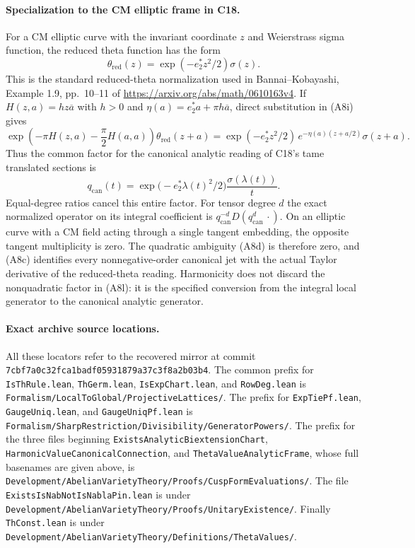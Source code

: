 \paragraph{Specialization to the CM elliptic frame in C18.}
For a CM elliptic curve with the invariant coordinate $z$ and
Weierstrass sigma function, the reduced theta function has the
form
\[
 \theta_{\mathrm{red}}(z)
       =\exp(-e_2^*z^2/2)\sigma(z).
 \tag{A8j}
\]
This is the standard reduced-theta normalization used in
Bannai--Kobayashi, Example 1.9, pp.~10--11 of
\url{https://arxiv.org/abs/math/0610163v4}.
If $H(z,a)=h z\overline a$ with $h>0$ and
$\eta(a)=e_2^*a+\pi h\overline a$, direct substitution in (A8i)
gives
\[
 \exp\left(-\pi H(z,a)-\frac\pi2H(a,a)\right)
          \theta_{\mathrm{red}}(z+a)
       =\exp(-e_2^*z^2/2)\,
             e^{-\eta(a)(z+a/2)}\sigma(z+a).
 \tag{A8k}
\]
Thus the common factor for the canonical analytic reading of
C18's tame translated sections is
\[
      q_{\mathrm{can}}(t)
       =\exp\bigl(-e_2^*\lambda(t)^2/2\bigr)
                         \frac{\sigma(\lambda(t))}{t}.
 \tag{A8l}
\]
Equal-degree ratios cancel this entire factor.  For tensor degree
$d$ the exact normalized operator on its integral coefficient is
$q_{\mathrm{can}}^{-d}D(q_{\mathrm{can}}^d\,\cdot)$.
On an elliptic curve with a CM field acting through a single
tangent embedding, the opposite tangent multiplicity is zero.
The quadratic ambiguity (A8d) is therefore zero, and (A8c)
identifies every nonnegative-order canonical jet with the actual
Taylor derivative of the reduced-theta reading.  Harmonicity
does not discard the nonquadratic factor in (A8l): it is the
specified conversion from the integral local generator to the
canonical analytic generator.

\paragraph{Exact archive source locations.}
All these locators refer to the recovered mirror at commit
\texttt{7cbf7a0c32fca1badf05931879a37c3f8a2b03b4}.
The common prefix for \texttt{IsThRule.lean},
\texttt{ThGerm.lean}, \texttt{IsExpChart.lean}, and
\texttt{RowDeg.lean} is
\texttt{Formalism/LocalToGlobal/ProjectiveLattices/}.
The prefix for \texttt{ExpTiePf.lean},
\texttt{GaugeUniq.lean}, and \texttt{GaugeUniqPf.lean} is
\texttt{Formalism/SharpRestriction/Divisibility/GeneratorPowers/}.
The prefix for the three files beginning
\texttt{ExistsAnalyticBiextensionChart},
\texttt{HarmonicValueCanonicalConnection}, and
\texttt{ThetaValueAnalyticFrame}, whose full basenames are given
above, is
\texttt{Development/AbelianVarietyTheory/Proofs/CuspFormEvaluations/}.
The file \texttt{ExistsIsNabNotIsNablaPin.lean} is under
\texttt{Development/AbelianVarietyTheory/Proofs/UnitaryExistence/}.
Finally \texttt{ThConst.lean} is under
\texttt{Development/AbelianVarietyTheory/Definitions/ThetaValues/}.

